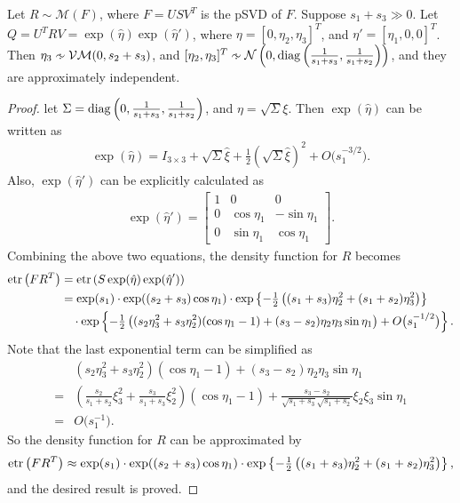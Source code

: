 \begin{theorem} \label{thm:MF-approx-2d}
	Let $R\sim\mathcal{M}(F)$, where $F=USV^T$ is the pSVD of $F$.
	Suppose $s_1+s_3\gg 0$.
	Let $Q = U^TRV = \exp\left(\hat{\eta}\right) \exp\left(\hat{\eta}'\right)$, where $\eta = [0, \eta_2, \eta_3]^T$, and $\eta' = [\eta_1, 0, 0]^T$.
	Then $\eta_3 \approxsim \mathcal{VM}(0,s_2+s_3)$, and $ [\eta_2, \eta_3]^T  \approxsim \mathcal{N}\left( 0, \diag\left( \tfrac{1}{s_1+s_3}, \tfrac{1}{s_1+s_2} \right) \right)$, and they are approximately independent.
\end{theorem}
\begin{proof}
	let $\Sigma = \mathrm{diag}\left( 0, \tfrac{1}{s_1+s_3}, \tfrac{1}{s_1+s_2} \right)$, and $\eta = \sqrt{\Sigma} \xi$.
	Then $\exp\left(\hat{\eta}\right)$ can be written as
	\begin{align*}
		\exp\left(\hat{\eta}\right) = I_{3\times 3} + \sqrt{\Sigma}\hat{\xi} + \tfrac{1}{2} \left( \sqrt{\Sigma}\hat{\xi} \right)^2 + O\big(s_1^{-3/2}\big).
	\end{align*}
	Also, $\exp\left(\hat{\eta}'\right)$ can be explicitly calculated as
	\begin{align*}
		\exp\left(\hat{\eta}'\right) = \begin{bmatrix}
			1 & 0 & 0 \\
			0 & \cos\eta_1 & -\sin\eta_1 \\
			0 & \sin\eta_1 & \cos\eta_1
		\end{bmatrix}.
	\end{align*}
	Combining the above two equations, the density function for $R$ becomes
	\begin{align*}
		\mathrm{etr}\left( FR^T \right) &= \mathrm{etr}\left( S\exp(\hat{\eta})\exp(\hat{\eta}') \right) \\
		&= \exp(s_1) \cdot \exp((s_2+s_3)\cos\eta_1) \cdot \exp\left\{ -\tfrac{1}{2} \left( (s_1+s_3)\eta_2^2 + (s_1+s_2)\eta_3^2 \right) \right\} \\
		&\quad \cdot \exp\left\{ -\tfrac{1}{2}\left( (s_2\eta_3^2 + s_3\eta_2^2)(\cos\eta_1-1) + (s_3-s_2)\eta_2\eta_3\sin\eta_1 \right) + O\big(s_1^{-1/2}\big) \right\}.
	\end{align*}
	Note that the last exponential term can be simplified as
	\begin{align*}
		&(s_2\eta_3^2 + s_3\eta_2^2)(\cos\eta_1-1) + (s_3-s_2)\eta_2\eta_3\sin\eta_1 \\
		= &\left( \tfrac{s_2}{s_1+s_2}\xi_3^2 + \tfrac{s_3}{s_1+s_3}\xi_2^2 \right)(\cos\eta_1-1) + \tfrac{s_3-s_2}{\sqrt{s_1+s_3} \sqrt{s_1+s_2}} \xi_2\xi_3 \sin\eta_1 \\
		= & O\big(s_1^{-1}\big).
	\end{align*}
	So the density function for $R$ can be approximated by
	\begin{align*}
		\mathrm{etr}\left( FR^T \right) \approx \exp(s_1) \cdot \exp((s_2+s_3)\cos\eta_1) \cdot \exp\left\{ -\tfrac{1}{2} \left( (s_1+s_3)\eta_2^2 + (s_1+s_2)\eta_3^2 \right) \right\},
	\end{align*}
	and the desired result is proved.
\end{proof}

